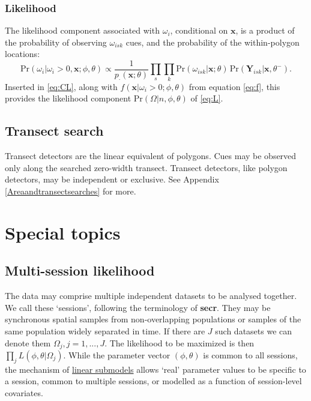 \documentclass[
]{book}
\begin{document}
\subsection{Likelihood}\label{likelihood}


The likelihood component associated with \(\omega_i\), conditional on \(\mathbf{x}\), is a product of the probability of observing \(\omega_{isk}\) cues, and the probability of the within-polygon locations:
\[
    \mbox{Pr}(\omega_i | \omega_i > 0, \mathbf{x}; \phi, \theta) \propto \frac{1}{p_\cdot(\mathbf{x}; \theta)} \prod_s \prod_k \mbox{Pr}(\omega_{isk} | \mathbf{x}; \theta) \, \mbox{Pr}(\mathbf{Y}_{isk} | \mathbf{x}, \theta^-).
   \]
Inserted in \eqref{eq:CL}, along with \(f(\mathbf{x} | \omega_i>0; \phi, \theta)\) from equation \eqref{eq:f}, this provides the likelihood component \(\mbox{Pr} (\Omega | n, \phi, \theta)\) of \eqref{eq:L}.

\section{Transect search}\label{transect-search}


Transect detectors are the linear equivalent of polygons. Cues may be observed only along the searched zero-width transect. Transect detectors, like polygon detectors, may be independent or exclusive. See Appendix \ref{Areaandtransectsearches} for more.

\chapter{Special topics}\label{SpecialTopics}

\section{Multi-session likelihood}\label{multi-session-likelihood}


The data may comprise multiple independent datasets to be analysed together. We call these `sessions', following the terminology of \textbf{secr}. They may be synchronous spatial samples from non-overlapping populations or samples of the same population widely separated in time. If there are \(J\) such datasets we can denote them \(\Omega_j, j = 1,...,J\). The likelihood to be maximized is then \(\prod_j L(\phi, \theta | \Omega_j)\). While the parameter vector \((\phi, \theta)\) is common to all sessions, the mechanism of \hyperref[linear-submodels]{linear submodels} allows `real' parameter values to be specific to a session, common to multiple sessions, or modelled as a function of session-level covariates.
\end{document}
